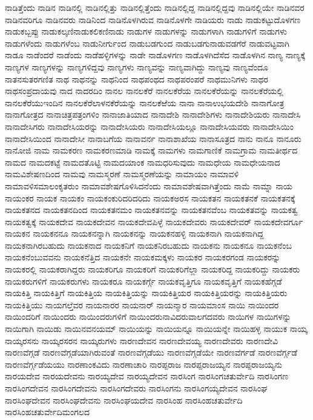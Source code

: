 {ನಾಡಿತ್ತೆಂದು
ನಾಡಿನ
ನಾಡಿನಲ್ಲಿ
ನಾಡಿನಲ್ಲಿತ್ತು
ನಾಡಿನಲ್ಲಿತ್ತೆಂದು
ನಾಡಿನಲ್ಲಿದ್ದ
ನಾಡಿನಲ್ಲಿದ್ದವು
ನಾಡಿನಲ್ಲಿಯೇ
ನಾಡಿನವರ
ನಾಡಿನವರಿಗೂ
ನಾಡಿನವರು
ನಾಡಿನಿಂದ
ನಾಡಿನೊಳಗಿರುವ
ನಾಡಿನೊಳಗೇ
ನಾಡಿಯರು
ನಾಡು
ನಾಡುಕಟ್ಟುದೊಳಗಣ
ನಾಡುಕಬ್ಬಪ್ಪು
ನಾಡುಕಲ್ಕಣಿನಾಡುಕಲಿಕಣಿನಾಡು
ನಾಡುಗಳ
ನಾಡುಗಳನ್ನು
ನಾಡುಗಳಾಗಿ
ನಾಡುಗಳಿಗೆ
ನಾಡುಗಳು
ನಾಡುಗಳೆಂದು
ನಾಡುಗಳೆಂಬ
ನಾಡುನೀರ್ಗುಂದ
ನಾಡುಬಡಗುಂದ
ನಾಡುಬಡಗುನಾಡುವಡಗೆರೆ
ನಾಡುವಟ್ಟವಾಗಿ
ನಾಡೂ
ನಾಡೆಂದರೆ
ನಾಡೆಂದು
ನಾಡೆಹಳ್ಳಿಗಳನ್ನು
ನಾಡೇ
ನಾಡೊಳಗಣ
ನಾಡೊಳಗಿದೆಸೆದ
ನಾಡೊಳಗಿನ
ನಾಣ್ಯ
ನಾಣ್ಯಕ್ಕೆ
ನಾಣ್ಯಗಳ
ನಾಣ್ಯಗಳನ್ನು
ನಾಣ್ಯಗಳಿದ್ದವು
ನಾಣ್ಯಗಳು
ನಾಣ್ಯವನ್ನು
ನಾಣ್ಯವಾಗಿದ್ದು
ನಾಣ್ಯವು
ನಾಣ್ಯವೆಂದೂ
ನಾತನಸುತರಗಣಿತ
ನಾಥ
ನಾಥನನ್ನು
ನಾಥನಿಂದ
ನಾಥಪಂಥದ
ನಾಥಪರಂಪರೆ
ನಾಥಮುನಿಗಳು
ನಾಥರ
ನಾಥಸಂಪ್ರದಾಯವು
ನಾದ
ನಾದರದಿಂ
ನಾನಲ
ನಾನಲಕೆರೆ
ನಾನಲಕೆರೆಯ
ನಾನಲಕೆರೆಯನ್ನು
ನಾನಲಕೆರೆಯಲ್ಲಿ
ನಾನಲಕೆರೆಯುಇಂದಿನ
ನಾನಲಕೆರೆಲಾಳನಕೆರೆಯನ್ನು
ನಾನಲಕೆಱೆಯ
ನಾನಾ
ನಾನಾಉಭಯದೇಶಿ
ನಾನಾಗೋತ್ರ
ನಾನಾಗೋತ್ರದ
ನಾನಾಚಿತ್ರಪತ್ರಂಗಳಿಂ
ನಾನಾಜಾತಿಯಾದ
ನಾನಾದೇಶಿ
ನಾನಾದೇಶಿಗಳು
ನಾನಾದೇಶಿಯರು
ನಾನಾದೇಸಿ
ನಾನಾದೇಸಿಗರು
ನಾನಾದೇಸಿಯರನ್ನು
ನಾನಾದೇಸಿಯರು
ನಾನಾದೇಸಿಯಲ್ಲೂ
ನಾನಾದೇಸಿಯವರು
ನಾನಾದೇಸಿಯಿಂ
ನಾನಾದೇಸಿಯಿಂದ
ನಾನಾದೇಸೀ
ನಾನಾಬಗೆಯ
ನಾನಾವರ್ನ
ನಾನಾಶಾಖೆಯ
ನಾನಾಸೂತ್ರದ
ನಾನು
ನಾನೂ
ನಾನೂರು
ನಾನೋಜಿ
ನಾಮ
ನಾಮಕರಣ
ನಾಮಕರಣಮಾಡಿ
ನಾಮಕ್ಕೆ
ನಾಮಗಳು
ನಾಮಗಾಣಿಕೆ
ನಾಮಗ್ರಾಮ
ನಾಮತೀರ್ಥದ
ನಾಮದ
ನಾಮದಕಟ್ಟೆ
ನಾಮದತೊಟ್ಟಿ
ನಾಮದಯಾಂಕ
ನಾಮಧರಿಸುವುದು
ನಾಮಧೇಯ
ನಾಮಧೇಯನಾದ
ನಾಮವಿಶೇಷಣದಿಂದ
ನಾಮವು
ನಾಮಸ್ಮರಣೆ
ನಾಮಸ್ಮರಣೆಯನ್ನು
ನಾಮಾಯಂ
ನಾಮಾವಳಿ
ನಾಮಾವಳಿಸಮಾಲಂಕೃತರುಂ
ನಾಮಾವಶೇಷಗೊಳಿಸಿದನೆಂದು
ನಾಮಾವಶೇಷವಾಗಿತ್ತೆಂದು
ನಾಮೆ
ನಾಮ್ನಾ
ನಾಯ
ನಾಯಂಕರ
ನಾಯಕ
ನಾಯಕಂ
ನಾಯಕಂಕುರಿದರಿದರಿದು
ನಾಯಕಅರಸ
ನಾಯಕತನ
ನಾಯಕತನಕೆ
ನಾಯಕತನಕ್ಕೆ
ನಾಯಕತನದ
ನಾಯಕತನದಿಂದ
ನಾಯಕತನಮಂ
ನಾಯಕತನವನ್ನು
ನಾಯಕತನವೆಂಬ
ನಾಯಕತವನ್ನು
ನಾಯಕತ್ವ
ನಾಯಕತ್ವಕ್ಕೆ
ನಾಯಕದೇವ
ನಾಯಕದೇವನ
ನಾಯಕದೇವಪಿಳ್ಳೆ
ನಾಯಕದೇವರು
ನಾಯಕದೇವರ್
ನಾಯಕದೇವರ್ಗೂ
ನಾಯಕನ
ನಾಯಕನನೂ
ನಾಯಕನನ್ನಾಗಿ
ನಾಯಕನನ್ನು
ನಾಯಕನಹಳ್ಳಿ
ನಾಯಕನಾಗಿ
ನಾಯಕನಾಗಿದ್ದ
ನಾಯಕನಾಗಿರಬಹುದು
ನಾಯಕನಾದ
ನಾಯಕನಿಗೆ
ನಾಯಕನಿರಬಹುದು
ನಾಯಕನು
ನಾಯಕನೂ
ನಾಯಕನೆಂಬ
ನಾಯಕನೆಂಬುವವನು
ನಾಯಕನೆತ್ತಿದ
ನಾಯಕನೇ
ನಾಯಕಮಕ್ಕಳು
ನಾಯಕರ
ನಾಯಕರಗಂಡ
ನಾಯಕರನ್ನು
ನಾಯಕರಲ್ಲಿ
ನಾಯಕರಾಗಿದ್ದರು
ನಾಯಕರಿಗೂ
ನಾಯಕರಿಗೆ
ನಾಯಕರಿಗೆಲ್ಲಾ
ನಾಯಕರಿದ್ದ
ನಾಯಕರಿದ್ದು
ನಾಯಕರು
ನಾಯಕರುಗಳಿಗೆ
ನಾಯಕರುಗಳು
ನಾಯಕರೂ
ನಾಯಕರ್ಗ್ಗೆ
ನಾಯಕವೃತ್ತಿಗೂ
ನಾಯಕವೃತ್ತಿಗೆ
ನಾಯಕಹೆಗ್ಗಡೆ
ನಾಯಕಿತ್ತಿ
ನಾಯಕಿತ್ತಿಗೆ
ನಾಯಕಿತ್ತಿಯ
ನಾಯಕಿತ್ತಿಯನ್ನು
ನಾಯಕಿತ್ತಿಯರ
ನಾಯಕಿತ್ತಿಯರನ್ನು
ನಾಯಕಿತ್ತಿಯರು
ನಾಯಕಿತ್ತಿಯು
ನಾಯಗಲ್ತೆವರ
ನಾಯನಾರರ
ನಾಯನಾರ್
ನಾಯನ್ಮಾರ
ನಾಯಮಾಂಸ
ನಾಯಿ
ನಾಯಿಂದರ
ನಾಯಿಂದರಿಗೆ
ನಾಯಿಂದರು
ನಾಯಿಂದರುಗಳಿಗೆ
ನಾಯಿಂದರುನಾವಿದರುವಾಲಗದವರು
ನಾಯಿಗಳ
ನಾಯಿಗಳನ್ನು
ನಾಯಿಗಾಗಿ
ನಾಯಿಡು
ನಾಯಿನವನಯಮ್
ನಾಯಿಯನ್ನು
ನಾಯಿಯನ್ನೂ
ನಾಯಿಯನ್ನೇ
ನಾಯಿಹಳ್ಳ
ನಾಯುಕ
ನಾಯ್ಕ
ನಾಯ್ಕರಸನು
ನಾಯ್ಕರಸರನ
ನಾಯ್ಕರುಗಳು
ನಾರಣದೇವನ
ನಾರಣದೇವಯ್ಯ
ನಾರಣದೇವರು
ನಾರಣದೇವಿ
ನಾರಣವೆಗ್ಗಡೆ
ನಾರಣವೆಗ್ಗಡೆಯಾಗಿರುವಂತೆ
ನಾರಣವೆಗ್ಗಡೆಯು
ನಾರಣವೆಗ್ಗಡೆಯೇ
ನಾರಣವೆರ್ಗಡೆ
ನಾರಣವೆರ್ಗ್ಗಡೆ
ನಾರಣವೆರ್ಗ್ಗಡೆಯಯು
ನಾರಣಾಂಕವಿದು
ನಾರಣಾಚಾರಿ
ನಾರಪ್ಪರಾಜ
ನಾರಪ್ಪರಾಜಯ್ಯನ
ನಾರಪ್ಪರಾಜಯ್ಯನು
ನಾರಯದೇವ
ನಾರಯದೇವನು
ನಾರಯ್ಯದೇವ
ನಾರಯ್ಯದೇವನ
ನಾರಸಿಂಗ
ನಾರಸಿಂಗಚತುರ್ವೇದಿ
ನಾರಸಿಂಗಣ
ನಾರಸಿಂಗದೇವನ
ನಾರಸಿಂಗದೇವನು
ನಾರಸಿಂಗದೇವರು
ನಾರಸಿಂಗನು
ನಾರಸಿಂಗಯ್ಯದೇವನ
ನಾರಸಿಂಘ
ನಾರಸಿಂಘದೇವನ
ನಾರಸಿಂಘದೇವನು
ನಾರಸಿಂಘಯದೇವ
ನಾರಸಿಂಹ
ನಾರಸಿಂಹಚತುರ್ವೇದಿ
ನಾರಸಿಂಹಚತುರ್ವೇದಿಮಂಗಲದ
}
